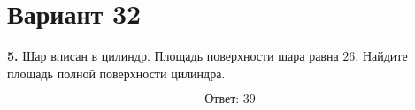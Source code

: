 \documentclass[12pt,a4paper]{article}
\begin{document}
\section*{Вариант 32}

\textbf{5.} Шар вписан в цилиндр. Площадь поверхности шара равна \(26\).
Найдите площадь полной поверхности цилиндра.

\begin{center}
\end{center}

\[
\boxed{\text{Ответ: }39}
\]
\end{document}
